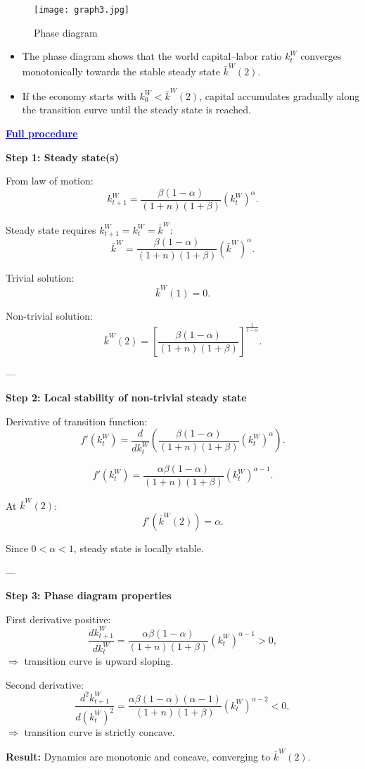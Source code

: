 \documentclass[12pt]{article}
\begin{document}
\begin{figure}[H]
    \centering
    \texttt{[image: graph3.jpg]}
    \caption{Phase diagram}
    \label{fig:phase_k_dynamics}
\end{figure}

\begin{itemize}
  \item The phase diagram shows that the world capital–labor ratio $k_t^W$ converges monotonically towards the stable steady state $\bar{k}^W(2)$.  

  \item If the economy starts with $k_0^W < \bar{k}^W(2)$, capital accumulates gradually along the transition curve until the steady state is reached.  
\end{itemize}

\textcolor{blue}{\textbf{\uline{Full procedure}}}

{\color{blue}
\textbf{Step 1: Steady state(s)}

From law of motion:
\[
k_{t+1}^W = \frac{\beta(1-\alpha)}{(1+n)(1+\beta)}(k_t^W)^{\alpha}.
\]

Steady state requires $k_{t+1}^W = k_t^W = \bar{k}^W$:
\[
\bar{k}^W = \frac{\beta(1-\alpha)}{(1+n)(1+\beta)}(\bar{k}^W)^{\alpha}.
\]

Trivial solution:
\[
\bar{k}^W(1)=0.
\]

Non-trivial solution:
\[
\bar{k}^W(2)=\left[\frac{\beta(1-\alpha)}{(1+n)(1+\beta)}\right]^{\tfrac{1}{1-\alpha}}.
\]

---

\textbf{Step 2: Local stability of non-trivial steady state}

Derivative of transition function:
\[
f'(k_t^W) = \frac{d}{dk_t^W}\left(\frac{\beta(1-\alpha)}{(1+n)(1+\beta)}(k_t^W)^{\alpha}\right).
\]

\[
f'(k_t^W)=\frac{\alpha\beta(1-\alpha)}{(1+n)(1+\beta)}(k_t^W)^{\alpha-1}. \tag{35}
\]

At $\bar{k}^W(2)$:
\[
f'(\bar{k}^W(2))=\alpha. \tag{36}
\]

Since $0<\alpha<1$, steady state is locally stable.

---

\textbf{Step 3: Phase diagram properties}

First derivative positive:
\[
\frac{dk_{t+1}^W}{dk_t^W}
=\frac{\alpha\beta(1-\alpha)}{(1+n)(1+\beta)}(k_t^W)^{\alpha-1}>0,
\]
$\Rightarrow$ transition curve is upward sloping.

Second derivative:
\[
\frac{d^2 k_{t+1}^W}{d(k_t^W)^2}
=\frac{\alpha\beta(1-\alpha)(\alpha-1)}{(1+n)(1+\beta)}(k_t^W)^{\alpha-2}<0,
\]
$\Rightarrow$ transition curve is strictly concave.


\textbf{Result:} Dynamics are monotonic and concave, converging to $\bar{k}^W(2)$.
}
\end{document}
